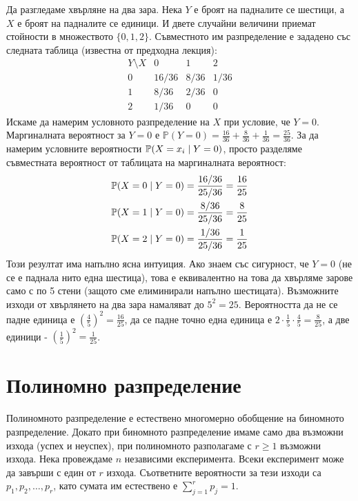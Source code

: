 \begin{example}\label{ex:08-2}
Да разгледаме хвърляне на два зара. Нека $Y$ е броят на падналите се шестици, а $X$ е броят на падналите се единици. И двете случайни величини приемат стойности в множеството $\{0, 1, 2\}$. Съвместното им разпределение е зададено със следната таблица (известна от предходна лекция):
\[
\begin{array}{c|c|c|c}
Y \setminus X & 0 & 1 & 2 \\
\hline
0 & 16/36 & 8/36 & 1/36 \\
1 & 8/36 & 2/36 & 0 \\
2 & 1/36 & 0 & 0
\end{array}
\]
Искаме да намерим условното разпределение на $X$ при условие, че $Y=0$. Маргиналната вероятност за $Y=0$ е $\mathbb{P}(Y=0) = \frac{16}{36} + \frac{8}{36} + \frac{1}{36} = \frac{25}{36}$. За да намерим условните вероятности $\mathbb{P}(X=x_i \mid Y=0)$, просто разделяме съвместната вероятност от таблицата на маргиналната вероятност:
\begin{align*}
\mathbb{P}(X=0 \mid Y=0) &= \frac{16/36}{25/36} = \frac{16}{25} \\
\mathbb{P}(X=1 \mid Y=0) &= \frac{8/36}{25/36} = \frac{8}{25} \\
\mathbb{P}(X=2 \mid Y=0) &= \frac{1/36}{25/36} = \frac{1}{25}
\end{align*}
Този резултат има напълно ясна интуиция. Ако знаем със сигурност, че $Y=0$ (не се е паднала нито една шестица), това е еквивалентно на това да хвърляме зарове само с по 5 стени (защото сме елиминирали напълно шестицата). Възможните изходи от хвърлянето на два зара намаляват до $5^2 = 25$. Вероятността да не се падне единица е $\left(\frac{4}{5}\right)^2 = \frac{16}{25}$, да се падне точно една единица е $2 \cdot \frac{1}{5} \cdot \frac{4}{5} = \frac{8}{25}$, а две единици - $\left(\frac{1}{5}\right)^2 = \frac{1}{25}$.

\end{example}

\section{Полиномно разпределение}

Полиномното разпределение е естествено многомерно обобщение на биномното разпределение. Докато при биномното разпределение имаме само два възможни изхода (успех и неуспех), при полиномното разполагаме с $r \ge 1$ възможни изхода.
Нека провеждаме $n$ независими експеримента. Всеки експеримент може да завърши с един от $r$ изхода. Съответните вероятности за тези изходи са $p_1, p_2, \dots, p_r$, като сумата им естествено е $\sum_{j=1}^{r} p_j = 1$.

